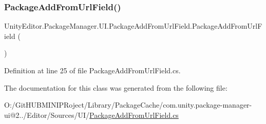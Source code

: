 \subsubsection{\texorpdfstring{PackageAddFromUrlField()}{PackageAddFromUrlField()}}
{\footnotesize\ttfamily Unity\+Editor.\+Package\+Manager.\+U\+I.\+Package\+Add\+From\+Url\+Field.\+Package\+Add\+From\+Url\+Field (\begin{DoxyParamCaption}{ }\end{DoxyParamCaption})}



Definition at line 25 of file Package\+Add\+From\+Url\+Field.\+cs.



The documentation for this class was generated from the following file\+:\begin{DoxyCompactItemize}
\item 
O\+:/\+Git\+H\+U\+B\+M\+I\+N\+I\+P\+Roject/\+Library/\+Package\+Cache/com.\+unity.\+package-\/manager-\/ui@2../\+Editor/\+Sources/\+U\+I/\mbox{\hyperlink{_package_add_from_url_field_8cs}{Package\+Add\+From\+Url\+Field.\+cs}}\end{DoxyCompactItemize}
